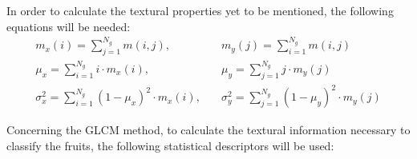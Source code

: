 \documentclass[../main.tex]{subfile}
\begin{document}
In order to calculate the textural properties yet to be mentioned, the following equations will be needed:
\begin{align*}
    m_{x}(i) = \sum^{N_{g}}_{j=1} m(i,j),                                 & \quad
    m_{y}(j) = \sum^{N_{g}}_{i=1} m(i,j)                                          \\
    \mu_{x} = \sum^{N_{g}}_{i=1} i \cdot m_{x}(i),                        & \quad
    \mu_{y} = \sum^{N_{g}}_{j=1} j \cdot m_{y}(j)                                 \\
    \sigma^{2}_{x} = \sum^{N_{g}}_{i=1} (1 - \mu_{x})^{2} \cdot m_{x}(i), & \quad
    \sigma^{2}_{y} = \sum^{N_{g}}_{j=1} (1 - \mu_{y})^{2} \cdot m_{y}(j)
\end{align*}

Concerning the GLCM method, to calculate the textural information necessary to classify the fruits, the following statistical descriptors will be used:
\end{document}
